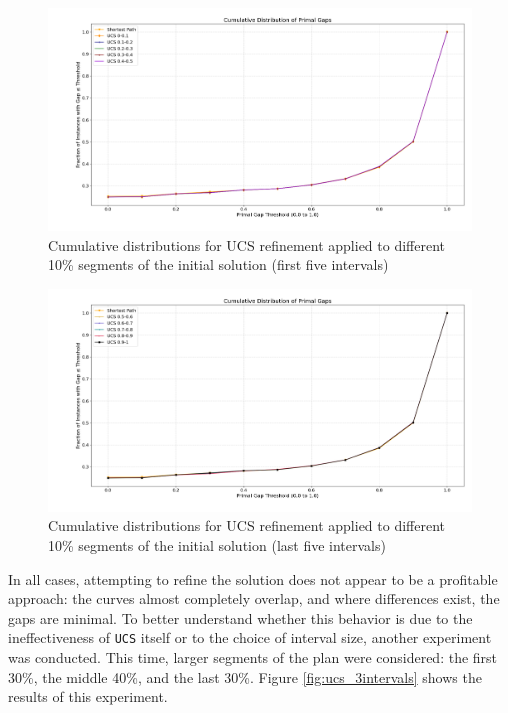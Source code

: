 \begin{figure}[ht]
	\centering
	\includegraphics[width=\textwidth]{images/ucs_first5_intervals.png}
	\caption{Cumulative distributions for UCS refinement applied to different 10\% segments of the initial solution (first five intervals)}
	\label{fig:ucs_first5}
\end{figure}

\begin{figure}[ht]
	\centering
	\includegraphics[width=\textwidth]{images/ucs_last5_intervals.png}
	\caption{Cumulative distributions for UCS refinement applied to different 10\% segments of the initial solution (last five intervals)}
	\label{fig:ucs_last5}
\end{figure}

In all cases, attempting to refine the solution does not appear to be a profitable approach: the curves almost completely overlap, and
where differences exist, the gaps are minimal. To better understand whether this behavior is due to the ineffectiveness of \verb|UCS| itself or
to the choice of interval size, another experiment was conducted. This time, larger segments of the plan were considered: the first 30\%,
the middle 40\%, and the last 30\%.
Figure \ref{fig:ucs_3intervals} shows the results of this experiment.


